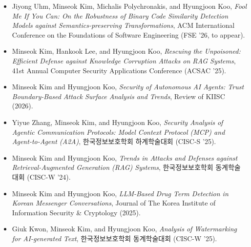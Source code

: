 \begin{sloppypar}

\begin{itemize}[leftmargin=*]
    \item Jiyong Uhm, Minseok Kim, Michalis Polychronakis, and Hyungjoon Koo, \emph{Fool Me If You Can: On the Robustness of Binary Code Similarity Detection Models against Semantics-preserving Transformations}, ACM International Conference on the Foundations of Software Engineering (FSE '26, to appear).
    \item Minseok Kim, Hankook Lee, and Hyungjoon Koo, \emph{Rescuing the Unpoisoned: Efficient Defense against Knowledge Corruption Attacks on RAG Systems}, 41st Annual Computer Security Applications Conference (ACSAC '25).
    \item Minseok Kim and Hyungjoon Koo, \emph{Security of Autonomous AI Agents: Trust Boundary-Based Attack Surface Analysis and Trends}, Review of KIISC (2026).
    \item Yiyue Zhang, Minseok Kim, and Hyungjoon Koo, \emph{Security Analysis of Agentic Communication Protocols: Model Context Protocol (MCP) and Agent-to-Agent (A2A)}, 한국정보보호학회 하계학술대회 (CISC-S '25).
    \item Minseok Kim and Hyungjoon Koo, \emph{Trends in Attacks and Defenses against Retrieval-Augmented Generation (RAG) Systems}, 한국정보보호학회 동계학술대회 (CISC-W '24).
    \item Minseok Kim and Hyungjoon Koo, \emph{LLM-Based Drug Term Detection in Korean Messenger Conversations}, Journal of The Korea Institute of Information Security \& Cryptology (2025).
    \item Giuk Kwon, Minseok Kim, and Hyungjoon Koo, \emph{Analysis of Watermarking for AI-generated Text}, 한국정보보호학회 동계학술대회 (CISC-W '25).


\end{itemize}
\end{sloppypar}
